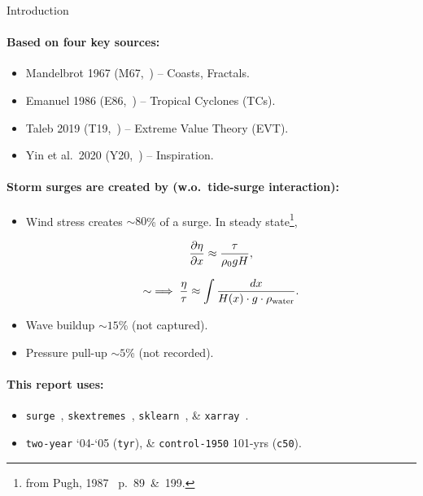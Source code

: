 
\begin{frame}{Introduction}

\vspace{-20pt}
\paragraph{Based on four key sources:}
\begin{itemize}
\item Mandelbrot 1967 (M67,~\cite{mandelbrot1967long}) -- Coasts, Fractals.
\item Emanuel 1986 (E86,~\cite{emanuel1986air}) -- Tropical Cyclones (TCs).
\item Taleb 2019 (T19,~\cite{taleb2019statistical}) -- Extreme Value Theory (EVT).
\item Yin et al.~2020 (Y20,~\cite{ZannaPreprint}) -- Inspiration.
\end{itemize}
\paragraph{Storm surges are created by (w.o.~tide-surge interaction):}
\begin{itemize}
\item  Wind stress creates $\sim 80$\% of a surge. In steady state\footnote{from Pugh, 1987~\cite{pugh1987tides} p.~89~\&~199.},

\begin{minipage}{0.45\linewidth}
\begin{equation}
\frac{\partial \eta}{\partial x}
\approx \frac{\tau}{\rho_{0} g H},
\notag
\label{eq:pugh}
\end{equation}
\end{minipage}
\begin{minipage}{0.45\linewidth}
\begin{equation}
\sim\implies \frac{\eta}{\tau} \approx \int \frac{d x}{H(x)\cdot g \cdot \rho_{\text {water}}}.
\notag
\end{equation}
\end{minipage}
\item Wave buildup $\sim 15$\% (not captured).
\item Pressure pull-up $\sim 5$\% (not recorded).
\end{itemize}
\paragraph{This report uses:}
\begin{itemize}
\item \texttt{surge}~\cite{gitlab}, \texttt{skextremes}~\cite{skextremes},
      \texttt{sklearn}~\cite{scikit-learn}, \& \texttt{xarray}~\cite{hoyer2017xarray}.
\item \texttt{two-year} `04-`05 (\texttt{tyr}), \&  \texttt{control-1950} 101-yrs (\texttt{c50}).
\end{itemize}

\end{frame}



